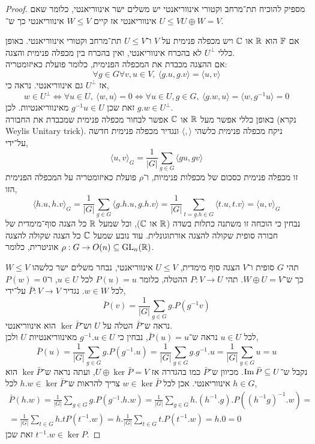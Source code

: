 \begin{proof}
	מספיק להוכיח תת־מרחב וקטורי אינווריאנטי יש משלים ישר אינווריאנטי,
	כלומר שאם $U \le V$ אינווריאנטי אז קיים $W \le V$ אינווריאנטי כך ש־$U \oplus W = V$.

	אם $\mathbb{F}$ הוא $\mathbb{R}$ או $\mathbb{C}$ ויש מכפלה פנימית על $V$ ו־$U \le V$ תת־מרחב וקטורי אינווריאנטי.
	באופן כללי $U^\perp$ לא בהכרח אינווריאנטי, ואין בהכרח בין מכפלה פנימית והצגה. \\
	אם ההצגה מכבדת את המכפלה הפנימית, כלומר פועלת כאיזומטריה:
	\[
		 \forall g \in G \forall v, u \in V,\ 
		 \langle g . u, g . v \rangle = \langle u, v \rangle
	\]
	אז $U^\perp$ גם אינווריאנטי. נראה כי,
	\[
		w \in U^\perp
		\iff \forall u \in U,\ \langle w, u \rangle = 0
		\iff \forall u \in U, g \in G,\ \langle g . w, u \rangle = \langle w, g^{-1} u \rangle = 0
	\]
	זאת שכן $g^{-1} u \in U$ מאינווריאנטיות. לכן $g . w \in U^\perp$. \\
	באופן כללי אפשר מעל $\mathbb{R}$ או $\mathbb{C}$ אפשר לבחור מכפלה פנימית שמכבדת את החבורה (נקרא Weylis Unitary trick).
	ניקח מכפלה פנימית כלשהי $\langle , \rangle$ ונגדיר מכפלה פנימית חדשה על־ידי,
	\[
		\langle u, v \rangle_G
		= \frac{1}{|G|} \sum_{g \in G} \langle g u, g v \rangle
	\]
	זו מכפלה פנימית כסכום של מכפלות פנימיות, ו־$\rho$ פועלת כאיזומטריה על המכפלה הפנימית הזו,
	\[
		\langle h . u, h . v \rangle_G
		= \frac{1}{|G|} \sum_{g \in G} \langle g . h . u, g . h . v \rangle
		= \frac{1}{|G|} \sum_{t = g . h \in G} \langle t . u, t . v \rangle
		= \langle u, v \rangle_G
	\]
	נבחין כי הוכחה זו משתנה כתלות בשדה ($\mathbb{R}$ או $\mathbb{C}$),
	וכל שמעל $\mathbb{R}$ כל הצגה סוף־מימדית של חבורה סופית שקולה להצגה אורתוגונלית.
	עוד נובע שמעל $\mathbb{C}$ כל הצגה שקולה להצגה אוניטרית, כלומר $\rho : G \to O(n) \subseteq \operatorname{GL}_n(\mathbb{R})$.

	תהי $G$ סופית ו־$V$ הצגה סוף מימדית, $U \le V$ אינווריאנטי,
	נבחר משלים ישר כלשהו $W \le V$ כך ש־$W \oplus U = V$.
	תהי $P : V \to U$ ההטלה, כלומר $P(u) = u$ לכל $u \in U$, ו־$P(w) = 0$ לכל $w \in W$.
	נגדיר $\bar{P} : V \to V$ על־ידי,
	\[
		\bar{P}(v)
		= \frac{1}{|G|} \sum_{g \in G} g . P(g^{-1} v)
	\]
	נראה ש־$\bar{P}$ הטלה על $U$ וש־$\ker \bar{P}$ הוא אינווריאנטי. \\
	לכל $u \in U$ נראה ש־$\bar{P}(u) = u$, נבחין כי $g^{-1} . u \in U$ מאינווריאנטיות $U$ ולכן,
	\[
		\bar{P}(u)
		= \frac{1}{|G|} \sum_{g \in G} g . P(g^{-1} . u)
		= \frac{1}{|G|} \sum_{g \in G} g . g^{-1} . u
		= \frac{1}{|G|} \sum_{g \in G} u
		= u
	\]
	נקבל ש־$\operatorname{Im} \bar{P} \subseteq U$.
	מכיוון ש־$\bar{P}$ כמו בהגדרה אז $U \oplus \ker \bar{P} = V$, ועתה נראה ש־$\ker \bar{P}$ הוא אינווריאנטי.
	אכן לכל $w \in \ker \bar{P}$ צריך להראות ש־$h . w \in \ker \bar{P}$ לכל $h \in G$,
	\begin{multline*}
		\bar{P}(h . w)
		= \frac{1}{|G|} \sum_{g \in G} g . P(g^{-1} . h . w)
		= \frac{1}{|G|} \sum_{g \in G} h . (h^{-1} . g) . P({(h^{-1} g)}^{-1} . w) = \\
		= \frac{1}{|G|} \sum_{t \in G} h . t P(t^{-1} . w)
		= h . \frac{1}{|G|} \sum_{t \in G} t . P(t^{-1}. w)
		= h . 0
		= 0
	\end{multline*}
	זאת שכן $t^{-1} . w \in \ker P$.
\end{proof}

